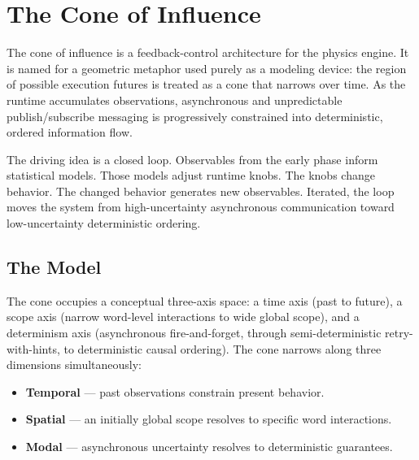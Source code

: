 
\section{The Cone of Influence}

The cone of influence is a feedback-control architecture for the physics engine.
It is named for a geometric metaphor used purely as a modeling device: the region
of possible execution futures is treated as a cone that narrows over time. As the
runtime accumulates observations, asynchronous and unpredictable publish/subscribe
messaging is progressively constrained into deterministic, ordered information flow.

The driving idea is a closed loop. Observables from the early phase inform
statistical models. Those models adjust runtime knobs. The knobs change behavior.
The changed behavior generates new observables. Iterated, the loop moves the
system from high-uncertainty asynchronous communication toward low-uncertainty
deterministic ordering.

\subsection{The Model}

The cone occupies a conceptual three-axis space: a time axis (past to future), a
scope axis (narrow word-level interactions to wide global scope), and a
determinism axis (asynchronous fire-and-forget, through semi-deterministic
retry-with-hints, to deterministic causal ordering). The cone narrows along three
dimensions simultaneously:

\begin{itemize}
  \item \textbf{Temporal} --- past observations constrain present behavior.
  \item \textbf{Spatial} --- an initially global scope resolves to specific word
        interactions.
  \item \textbf{Modal} --- asynchronous uncertainty resolves to deterministic
        guarantees.
\end{itemize}

